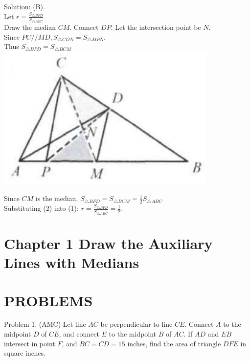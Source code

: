 \documentclass[10pt]{article}
\begin{document}
Solution: (B).\\
Let \(r=\frac{S_{\triangle B P D}}{S_{\triangle A B C}}\)\\
Draw the median \(C M\). Connect \(D P\). Let the intersection point be \(N\).\\
Since \(P C / / M D, S_{\triangle C D N}=S_{\triangle M P N}\).\\
Thus \(S_{\triangle B P D}=S_{\triangle B C M}\)\\
\includegraphics[max width=\textwidth, center]{2025_04_17_97bc1f7e44d93c271a88g-014}

Since \(C M\) is the median, \(S_{\triangle B P D}=S_{\triangle B C M}=\frac{1}{2} S_{\triangle A B C}\)\\
Substituting (2) into (1): \(r=\frac{S_{\triangle B P D}}{S_{\triangle A B C}}=\frac{1}{2}\).

\section*{Chapter 1 Draw the Auxiliary Lines with Medians}
\section*{PROBLEMS}
Problem 1. (AMC) Let line \(A C\) be perpendicular to line \(C E\). Connect \(A\) to the midpoint \(D\) of \(C E\), and connect \(E\) to the midpoint \(B\) of \(A C\). If \(A D\) and \(E B\) intersect in point \(F\), and \(B C=C D=15\) inches, find the area of triangle \(D F E\) in square inches.
\end{document}

